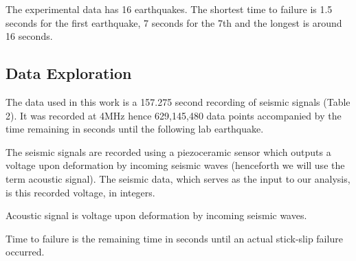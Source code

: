 \documentclass[]{llncs} %
\begin{document}
The experimental data has 16 earthquakes. The shortest time to failure is 1.5 seconds for the first earthquake, 7 seconds for the 7th and the longest is around 16 seconds. \par

\subsection{Data Exploration}
The data used in this work is a 157.275 second recording of seismic signals (Table 2). It was recorded at 4MHz hence 629,145,480 data points accompanied by the time remaining in seconds until the following lab earthquake.\par
The seismic signals are recorded using a piezoceramic sensor which outputs a voltage upon deformation by incoming seismic waves (henceforth we will use the term acoustic signal). The seismic data, which serves as the input to our analysis, is this recorded voltage, in integers. \par

Acoustic signal is voltage upon deformation by incoming seismic waves. \par
Time to failure is the remaining time in seconds until an actual stick-slip failure occurred. \par
\end{document}
